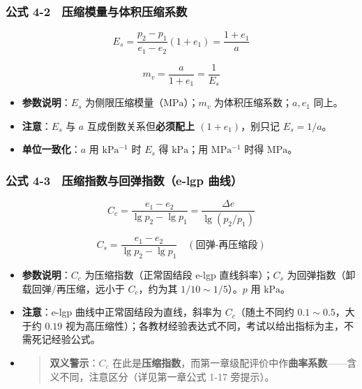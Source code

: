 \documentclass[
]{article}
\providecommand{\tightlist}{%
  \setlength{\itemsep}{0pt}\setlength{\parskip}{0pt}}
\begin{document}
\subsubsection{公式
4-2　压缩模量与体积压缩系数}\label{ux516cux5f0f-4-2-ux538bux7f29ux6a21ux91cfux4e0eux4f53ux79efux538bux7f29ux7cfbux6570}

\[E_s=\frac{p_2-p_1}{e_1-e_2}(1+e_1)=\frac{1+e_1}{a}\]

\[m_v=\frac{a}{1+e_1}=\frac{1}{E_s}\]

\begin{itemize}
\tightlist
\item
  \textbf{参数说明}：\(E_s\) 为侧限压缩模量（\(\mathrm{MPa}\)）；\(m_v\)
  为体积压缩系数；\(a,e_1\) 同上。
\item
  \textbf{注意}：\(E_s\) 与 \(a\) 互成倒数关系但\textbf{必须配上
  \((1+e_1)\)}，别只记 \(E_s=1/a\)。
\item
  \textbf{单位一致化}：\(a\) 用 \(\mathrm{kPa^{-1}}\) 时 \(E_s\) 得
  \(\mathrm{kPa}\)；用 \(\mathrm{MPa^{-1}}\) 时得 \(\mathrm{MPa}\)。
\end{itemize}

\subsubsection{公式 4-3　压缩指数与回弹指数（e-lgp
曲线）}\label{ux516cux5f0f-4-3-ux538bux7f29ux6307ux6570ux4e0eux56deux5f39ux6307ux6570e-lgp-ux66f2ux7ebf}

\[C_c=\frac{e_1-e_2}{\lg p_2-\lg p_1}=\frac{\Delta e}{\lg(p_2/p_1)}\]

\[C_s=\frac{e_1-e_2}{\lg p_2-\lg p_1}\quad(\text{回弹-再压缩段})\]

\begin{itemize}
\item
  \textbf{参数说明}：\(C_c\) 为压缩指数（正常固结段 e-lgp
  直线斜率）；\(C_s\) 为回弹指数（卸载回弹/再压缩，远小于
  \(C_c\)，约为其 \(1/10\sim1/5\)）。\(p\) 用 \(\mathrm{kPa}\)。
\item
  \textbf{注意}：e-lgp 曲线中正常固结段为直线，斜率为
  \(C_c\)（随土不同约 \(0.1\sim0.5\)，大于约 \(0.19\)
  视为高压缩性）；各教材经验表达式不同，考试以给出指标为主，不需死记经验公式。
\item
  \begin{quote}
  \textbf{双义警示}：\(C_c\)
  在此是\textbf{压缩指数}，而第一章级配评价中作\textbf{曲率系数}------含义不同，注意区分（详见第一章公式
  1-17 旁提示）。
  \end{quote}
\end{itemize}
\end{document}
